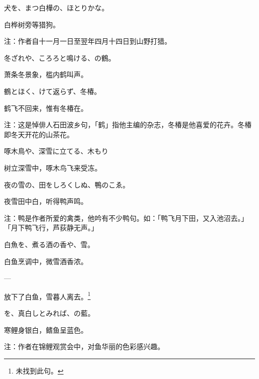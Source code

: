 \begin{haiku}
    {\FH {}犬を、まつ白樺の、ほとりかな。}

    {\FK 白桦树旁等猎狗。}

    {\FT 注：作者自十一月一日至翌年四月十四日到山野打猎。}
\end{haiku}

\begin{haiku}
    {\FH 冬ざれや、ころろと鳴ける、の鶴。}

    {\FK 萧条冬景象，槛内鹤叫声。}
\end{haiku}

\begin{haiku}
    {\FH 鶴とほく、けて返らず、冬椿。}

    {\FK 鹤飞不回来，惟有冬椿在。}

    {\FT 注：这是悼俳人石田波乡句，「鹤」指他主编的杂志，冬椿是他喜爱的花卉。冬椿即冬天开花的山茶花。}
\end{haiku}

\begin{haiku}
    {\FH 啄木鳥や、深雪に立てる、木もり}

    {\FK 树立深雪中，啄木鸟飞来受冻。}
\end{haiku}

\begin{haiku}
    {\FH 夜の雪の、田をしろくしぬ、鴨のこゑ。}

    {\FK 夜雪田中白，听得鸭声鸣。}

    {\FT 注：鸭是作者所爱的禽类，他吟有不少鸭句。如：「鸭飞月下田，又入池沼去。」 「月下鸭飞行，芦荻静无声。」}
\end{haiku}

\begin{haiku}
    {\FH 白魚を、煮る酒の香や、雪。}

    {\FK 白鱼烹调中，微雪酒香浓。}
\end{haiku}

\begin{haiku}
    {\FH ---}

    {\FK 放下了白鱼，雪暮人离去。\footnote{\FT 未找到此句。}}
\end{haiku}

\begin{haiku}
    {\FH {}を、真白しとみれば、の藍。}

    {\FK 寒鲤身银白，鳍鱼呈蓝色。}

    {\FT 注：作者在锦鲤观赏会中，对鱼华丽的色彩感兴趣。}
\end{haiku}

